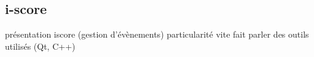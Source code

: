 \subsection{i-score}

présentation iscore (gestion d'évènements)
particularité
vite fait parler des outils utilisés (Qt, C++)